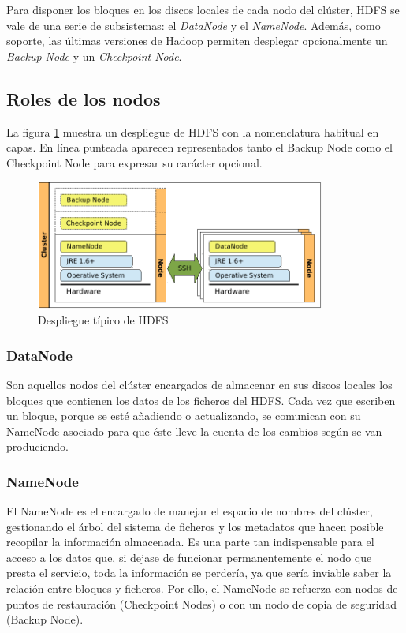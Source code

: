 Para disponer los bloques en los discos locales de cada nodo del cl\'uster, HDFS se vale de una serie de subsistemas: el \emph{DataNode} y el \emph{NameNode}. Adem\'as, como soporte, las \'ultimas versiones de Hadoop permiten desplegar opcionalmente un \emph{Backup Node} y un \emph{Checkpoint Node}.


\subsection{Roles de los nodos}\label{subsec:rolesnodos}
\noindent La figura \ref{fig:desplieguehdfs} muestra un despliegue de HDFS con la nomenclatura habitual en capas. En l\'inea punteada aparecen representados tanto el Backup Node como el Checkpoint Node para expresar su car\'acter opcional.

\begin{figure}[tbp]
\begin{center}
\includegraphics[width=0.85\textwidth]{imagenes/017.pdf}
 \caption{Despliegue t\'ipico de HDFS}
\label{fig:desplieguehdfs}
\end{center}
\end{figure}


\subsubsection{DataNode}\label{subsubsec:datanode}
\noindent Son aquellos nodos del cl\'uster encargados de almacenar en sus discos locales los bloques que contienen los datos de los ficheros del HDFS. Cada vez que escriben un bloque, porque se est\'e a\~nadiendo o actualizando, se comunican con su NameNode asociado para que \'este lleve la cuenta de los cambios seg\'un se van produciendo.


\subsubsection{NameNode}\label{subsubsec:namenode}
\noindent El NameNode es el encargado de manejar el espacio de nombres del cl\'uster, gestionando el \'arbol del sistema de ficheros y los metadatos que hacen posible recopilar la informaci\'on almacenada. Es una parte tan indispensable para el acceso a los datos que, si dejase de funcionar permanentemente el nodo que presta el servicio, toda la informaci\'on se perder\'ia, ya que ser\'ia inviable saber la relaci\'on entre bloques y ficheros. Por ello, el NameNode se refuerza con nodos de puntos de restauraci\'on (Checkpoint Nodes) o con un nodo de copia de seguridad (Backup Node).\newline

